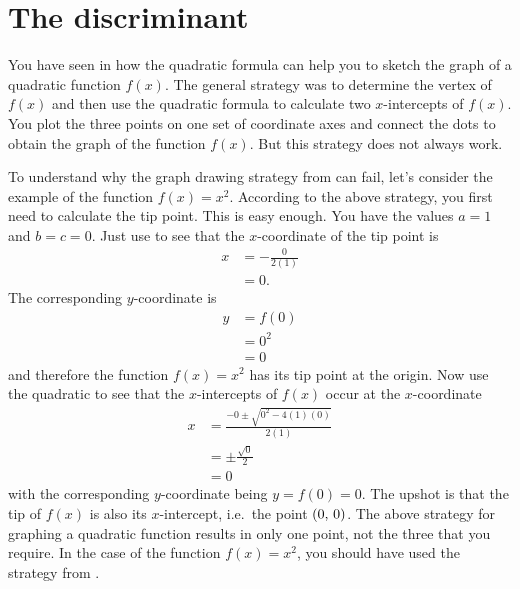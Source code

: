 \documentclass[a4paper,oneside,12pt]{article}
\begin{document}

\section{The discriminant}

You have seen in  how the quadratic
formula can help you to sketch the graph of a quadratic function
$f(x)$.  The general strategy was to determine the vertex of $f(x)$
and then use the quadratic formula to calculate two $x$-intercepts of
$f(x)$.  You plot the three points on one set of coordinate axes and
connect the dots to obtain the graph of the function $f(x)$.  But this
strategy does not always work.

To understand why the graph drawing strategy
from  can fail, let's consider the
example of the function $f(x) = x^2$.  According to the above
strategy, you first need to calculate the tip point.  This is easy
enough.  You have the values $a = 1$ and $b = c = 0$.  Just use
 to see that the
$x$-coordinate of the tip point is
\begin{align*}
x
&=
-\frac{0}{2(1)} \\[4pt]
&=
0.
\end{align*}
The corresponding $y$-coordinate is
\begin{align*}
y
&=
f(0) \\[4pt]
&=
0^2 \\[4pt]
&=
0
\end{align*}
and therefore the function $f(x) = x^2$ has its tip point at the
origin.  Now use the quadratic  to see
that the $x$-intercepts of $f(x)$ occur at the $x$-coordinate
\begin{align*}
x
&=
\frac{
  -0 \pm \sqrt{0^2 - 4(1)(0)}
}{
  2(1)
} \\[4pt]
&=
\pm
\frac{
  \sqrt{0}
}{
  2
} \\[4pt]
&=
0
\end{align*}
with the corresponding $y$-coordinate being $y = f(0) = 0$.  The
upshot is that the tip of $f(x)$ is also its $x$-intercept, i.e.~the
point $\left\lparen{0},\, {0}\right\rparen$.  The above strategy for graphing a quadratic
function results in only one point, not the three that you require.
In the case of the function $f(x) = x^2$, you should have used the
strategy from .
\end{document}
